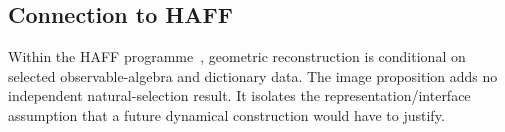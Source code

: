 \documentclass[12pt,a4paper,openany]{book}
\begin{document}
\subsection{Connection to HAFF}

Within the HAFF programme~\cite{Liu2026PaperA,Liu2026PaperB}, geometric reconstruction is conditional on selected observable-algebra and dictionary data.  The image proposition adds no independent natural-selection result.  It isolates the representation/interface assumption that a future dynamical construction would have to justify.



\backmatter

\end{document}
